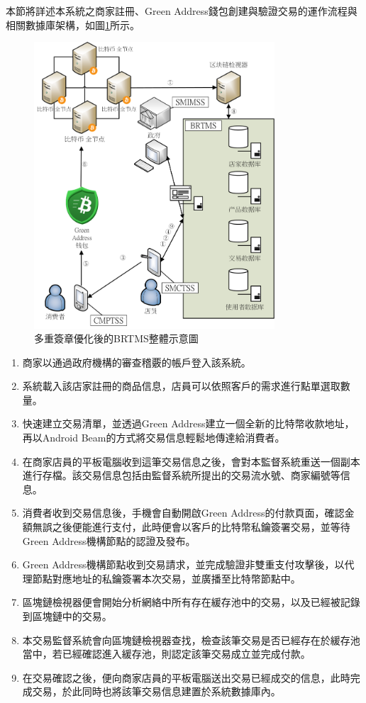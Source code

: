 本節將詳述本系統之商家註冊、Green Address錢包創建與驗證交易的運作流程與相關數據庫架構，如圖\ref{gabpcss}所示。

	\begin{figure}[htbp]
		\centering
		\includegraphics[width = 0.8\textwidth]{gabpcss.png}
		\caption{多重簽章優化後的BRTMS整體示意圖}\label{gabpcss}
	\end{figure}

	\begin{enumerate}
		\item 商家以通過政府機構的審查稽覈的帳戶登入該系統。
		\item 系統載入該店家註冊的商品信息，店員可以依照客戶的需求進行點單選取數量。
		\item 快速建立交易清單，並透過Green Address建立一個全新的比特幣收款地址，再以Android Beam的方式將交易信息輕鬆地傳達給消費者。
		\item 在商家店員的平板電腦收到這筆交易信息之後，會對本監督系統重送一個副本進行存檔。該交易信息包括由監督系統所提出的交易流水號、商家編號等信息。
		\item 消費者收到交易信息後，手機會自動開啟Green Address的付款頁面，確認金額無誤之後便能進行支付，此時便會以客戶的比特幣私鑰簽署交易，並等待Green Address機構節點的認證及發布。
		\item Green Address機構節點收到交易請求，並完成驗證非雙重支付攻擊後，以代理節點對應地址的私鑰簽署本次交易，並廣播至比特幣節點中。
		\item 區塊鏈檢視器便會開始分析網絡中所有存在緩存池中的交易，以及已經被記錄到區塊鏈中的交易。
		\item 本交易監督系統會向區塊鏈檢視器查找，檢查該筆交易是否已經存在於緩存池當中，若已經確認進入緩存池，則認定該筆交易成立並完成付款。
		\item 在交易確認之後，便向商家店員的平板電腦送出交易已經成交的信息，此時完成交易，於此同時也將該筆交易信息建置於系統數據庫內。
	\end{enumerate}